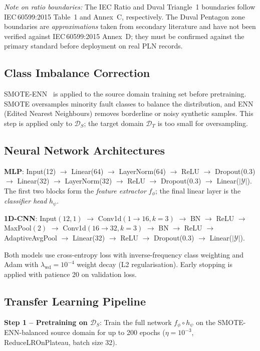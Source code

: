 \documentclass[conference]{IEEEtran}
\begin{document}
\textit{Note on ratio boundaries:} The IEC Ratio and Duval
Triangle~1 boundaries follow IEC\,60599:2015 Table~1 and Annex~C,
respectively.
The Duval Pentagon zone boundaries are \emph{approximations}
taken from secondary literature and have not been verified against
IEC\,60599:2015 Annex~D; they must be confirmed against the
primary standard before deployment on real PLN records.

\subsection{Class Imbalance Correction}
SMOTE-ENN~\cite{Wang2024SMOTE} is applied to the source domain
training set before pretraining.
SMOTE oversamples minority fault classes to balance the distribution,
and ENN (Edited Nearest Neighbours) removes borderline or noisy
synthetic samples.
This step is applied only to $\mathcal{D}_S$; the target domain
$\mathcal{D}_T$ is too small for oversampling.

\subsection{Neural Network Architectures}
\textbf{MLP}: Input(12) $\to$ Linear(64) $\to$ LayerNorm(64) $\to$
ReLU $\to$ Dropout(0.3) $\to$ Linear(32) $\to$ LayerNorm(32) $\to$
ReLU $\to$ Dropout(0.3) $\to$ Linear($|\mathcal{Y}|$).
The first two blocks form the \emph{feature extractor} $f_\phi$;
the final linear layer is the \emph{classifier head} $h_\psi$.

\textbf{1D-CNN}: Input$(12, 1)$ $\to$
Conv1d$(1\!\to\!16, k\!=\!3)$ $\to$ BN $\to$ ReLU $\to$ MaxPool$(2)$
$\to$ Conv1d$(16\!\to\!32, k\!=\!3)$ $\to$ BN $\to$ ReLU
$\to$ AdaptiveAvgPool $\to$ Linear(32) $\to$ ReLU $\to$
Dropout(0.3) $\to$ Linear($|\mathcal{Y}|$).

Both models use cross-entropy loss with inverse-frequency class
weighting and Adam with $\lambda_{\text{wd}}=10^{-4}$ weight decay
(L2 regularisation).
Early stopping is applied with patience 20 on validation loss.

\subsection{Transfer Learning Pipeline}
\textbf{Step 1 -- Pretraining on $\mathcal{D}_S$}:
Train the full network $f_\phi \circ h_\psi$ on the
SMOTE-ENN-balanced source domain for up to 200 epochs
($\eta = 10^{-3}$, ReduceLROnPlateau, batch size 32).
\end{document}
